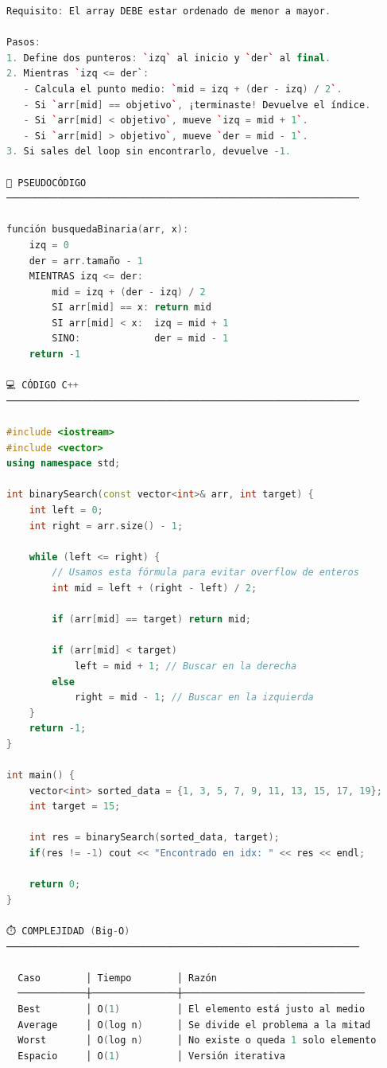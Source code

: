 \documentclass{article}
\begin{document}
\begin{lstlisting}[language=C++]
Requisito: El array DEBE estar ordenado de menor a mayor.

Pasos:
1. Define dos punteros: `izq` al inicio y `der` al final.
2. Mientras `izq <= der`:
   - Calcula el punto medio: `mid = izq + (der - izq) / 2`.
   - Si `arr[mid] == objetivo`, ¡terminaste! Devuelve el índice.
   - Si `arr[mid] < objetivo`, mueve `izq = mid + 1`.
   - Si `arr[mid] > objetivo`, mueve `der = mid - 1`.
3. Si sales del loop sin encontrarlo, devuelve -1.

📝 PSEUDOCÓDIGO
──────────────────────────────────────────────────────────────

función busquedaBinaria(arr, x):
    izq = 0
    der = arr.tamaño - 1
    MIENTRAS izq <= der:
        mid = izq + (der - izq) / 2
        SI arr[mid] == x: return mid
        SI arr[mid] < x:  izq = mid + 1
        SINO:             der = mid - 1
    return -1

💻 CÓDIGO C++
──────────────────────────────────────────────────────────────

#include <iostream>
#include <vector>
using namespace std;

int binarySearch(const vector<int>& arr, int target) {
    int left = 0;
    int right = arr.size() - 1;

    while (left <= right) {
        // Usamos esta fórmula para evitar overflow de enteros
        int mid = left + (right - left) / 2;

        if (arr[mid] == target) return mid;
        
        if (arr[mid] < target)
            left = mid + 1; // Buscar en la derecha
        else
            right = mid - 1; // Buscar en la izquierda
    }
    return -1;
}

int main() {
    vector<int> sorted_data = {1, 3, 5, 7, 9, 11, 13, 15, 17, 19};
    int target = 15;

    int res = binarySearch(sorted_data, target);
    if(res != -1) cout << "Encontrado en idx: " << res << endl;
    
    return 0;
}

⏱️ COMPLEJIDAD (Big-O)
──────────────────────────────────────────────────────────────

  Caso        │ Tiempo        │ Razón
  ────────────┼───────────────┼────────────────────────────────
  Best        │ O(1)          │ El elemento está justo al medio
  Average     │ O(log n)      │ Se divide el problema a la mitad
  Worst       │ O(log n)      │ No existe o queda 1 solo elemento
  Espacio     │ O(1)          │ Versión iterativa
\end{lstlisting}
\end{document}
